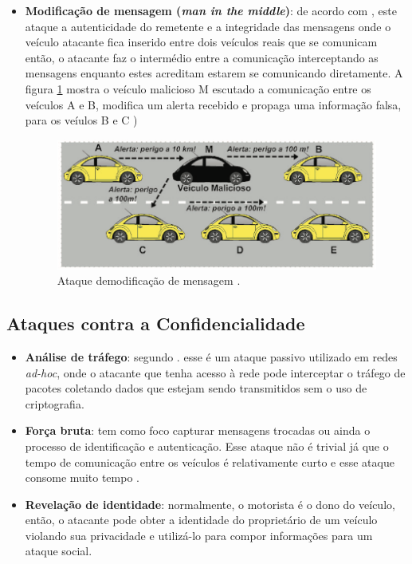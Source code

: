 \documentclass[
	12pt,				%
	oneside,			%
	a4paper,			%
	english,			%
	brazil				%
	]{abntex2ppgsi}
\begin{document}
\begin{itemize}
	\item {\textbf{Modificação de mensagem (\textit{man in the middle})}: de acordo com , este ataque a autenticidade do remetente e a integridade das mensagens onde o veículo atacante fica inserido entre dois veículos reais que se comunicam então, o atacante faz o intermédio entre a comunicação interceptando as mensagens enquanto estes acreditam estarem se comunicando diretamente.  A figura \ref{fig:ataquemiddle}  mostra o veículo malicioso M escutado a comunicação entre os veículos A e B, modifica um alerta recebido e propaga uma informação falsa, para os veíulos B e C ) 	}

\begin{figure}[!h]
	\centering
	\includegraphics [width=12cm] {images/ataquemainmiddle.png}
	\caption{Ataque demodificação de mensagem \cite{wanghamsegurancca}.}
	\label{fig:ataquemiddle}
\end{figure}

\end{itemize}

\subsection{Ataques contra a Confidencialidade}

\begin{itemize}

	\item {\textbf{Análise de tráfego}: segundo . esse é um ataque passivo utilizado em redes \textit{ad-hoc}, onde o atacante que tenha acesso à rede pode interceptar o tráfego de pacotes coletando dados que estejam sendo transmitidos sem o uso de criptografia.}

	\item {\textbf{Força bruta}: tem como foco capturar mensagens trocadas  ou ainda o processo de identificação e autenticação. Esse ataque não é trivial já que o tempo de comunicação entre os veículos é relativamente curto e esse ataque consome muito tempo \cite{pathre2013identification}.}

	\item {\textbf{Revelação de identidade}: normalmente, o motorista é o dono do veículo, então, o atacante pode obter a identidade do proprietário de um veículo violando sua privacidade \cite{tangade2013survey} e utilizá-lo para compor informações para um ataque social.}
	
\end{itemize}
\end{document}
